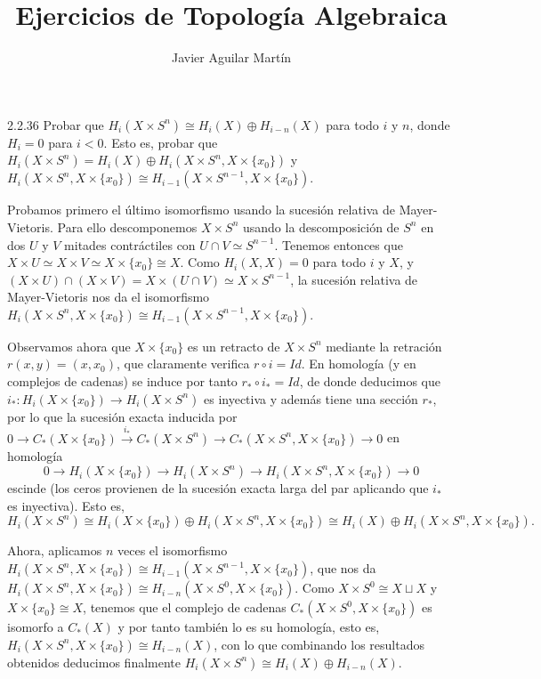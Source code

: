 \documentclass[twoside]{article}
\begin{document}
\title{Ejercicios de Topología Algebraica}
\author{Javier Aguilar Martín}
\maketitle

\begin{ejercicio}{2.2.36}
Probar que $H_i(X\times S^n)\cong H_i(X)\oplus H_{i-n}(X)$ para todo $i$ y $n$, donde $H_i=0$ para $i<0$. Esto es, probar que $H_i(X\times S^n)=H_i(X)\oplus H_i(X\times S^n,X\times\{x_0\})$ y $H_i(X\times S^n,X\times\{x_0\})\cong H_{i-1}(X\times S^{n-1},X\times\{x_0\})$.
\end{ejercicio}
\begin{solucion}
Probamos primero el último isomorfismo usando la sucesión relativa de Mayer-Vietoris. Para ello descomponemos $X\times S^n$ usando la descomposición de $S^n$ en dos $U$ y $V$ mitades contráctiles con $U\cap V\simeq S^{n-1}$. Tenemos entonces que $X\times U\simeq X\times V\simeq X\times \{x_0\}\cong X$. Como $H_i(X,X)=0$ para todo $i$ y $X$, y $(X\times U)\cap (X\times V)=X\times (U\cap V)\simeq X\times S^{n-1}$,  la sucesión relativa de Mayer-Vietoris nos da el isomorfismo $H_i(X\times S^n,X\times\{x_0\})\cong H_{i-1}(X\times S^{n-1},X\times\{x_0\})$. 

Observamos ahora que $X\times\{x_0\}$ es un retracto de $X\times S^n$ mediante la retración $r(x,y)=(x,x_0)$, que claramente verifica $r\circ i=Id$. En homología (y en complejos de cadenas) se induce por tanto $r_*\circ i_*=Id$, de donde deducimos que $i_*:H_i(X\times\{x_0\})\to H_i(X\times S^n)$ es inyectiva y además tiene una sección $r_*$, por lo que la sucesión exacta inducida por $0\to C_*(X\times\{x_0\})\xrightarrow{i_*} C_*(X\times S^n)\to C_*(X\times S^n,X\times\{x_0\})\to 0$ en homología
\[
0\to H_i(X\times\{x_0\})\to H_i(X\times S^n)\to H_i(X\times S^n,X\times\{x_0\})\to 0
\]
escinde (los ceros provienen de la sucesión exacta larga del par aplicando que $i_*$ es inyectiva). Esto es, $$H_i(X\times S^n)\cong  H_i(X\times\{x_0\})\oplus H_i(X\times S^n,X\times\{x_0\})\cong H_i(X)\oplus H_i(X\times S^n,X\times\{x_0\}).$$

Ahora, aplicamos $n$ veces el isomorfismo $H_i(X\times S^n,X\times\{x_0\})\cong H_{i-1}(X\times S^{n-1},X\times\{x_0\})$, que nos da $H_i(X\times S^n,X\times\{x_0\})\cong H_{i-n}(X\times S^0,X\times\{x_0\})$. Como $X\times S^0\cong X\sqcup X$ y $X\times \{x_0\}\cong X$, tenemos que el complejo de cadenas $C_*(X\times S^0,X\times\{x_0\})$ es isomorfo a $C_*(X)$ y por tanto también lo es su homología, esto es, $H_i(X\times S^n,X\times\{x_0\})\cong H_{i-n}(X)$, con lo que combinando los resultados obtenidos deducimos finalmente
$
H_i(X\times S^n)\cong H_i(X)\oplus H_{i-n}(X).
$

\end{solucion}
\end{document}
